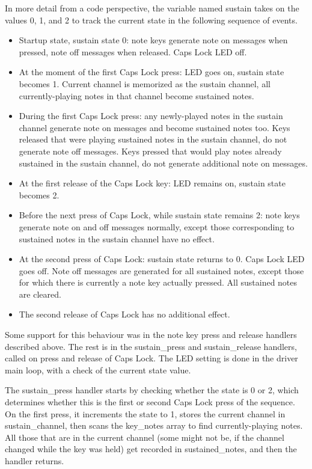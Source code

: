 In more detail from a code perspective, the variable named sustain takes on
the values 0, 1, and 2 to track the current state in the following sequence
of events.
\begin{itemize}
  \item Startup state, sustain state 0:  note keys generate note on messages
    when pressed, note off messages when released.  Caps Lock LED off.
  \item At the moment of the first Caps Lock press:  LED goes on, sustain
    state becomes 1.  Current channel is memorized as the sustain channel,
    all currently-playing notes in that channel become sustained notes.
  \item During the first Caps Lock press:  any newly-played notes in the
    sustain channel generate note on messages and become sustained notes too.
    Keys released that were
    playing sustained notes in the sustain channel, do not generate note
    off messages.  Keys pressed that would play notes already sustained
    in the sustain channel, do not generate additional note on messages.
  \item At the first release of the Caps Lock key:  LED remains on, sustain
    state becomes 2.
  \item Before the next press of Caps Lock, while sustain state remains 2:
    note keys generate note on and off messages normally, except those
    corresponding to sustained notes in the sustain channel have no effect.
  \item At the second press of Caps Lock:  sustain state returns to 0.  Caps
    Lock LED goes off.  Note
    off messages are generated for all sustained notes, except those for
    which there is currently a note key actually pressed.  All sustained
    notes are cleared.
  \item The second release of Caps Lock has no additional effect.
\end{itemize}

Some support for this behaviour was in the note key press and release
handlers described above.  The rest is in the sustain\_press and
sustain\_release handlers, called on press and release of Caps Lock.  The
LED setting is done in the driver main loop, with a check of the current
state value.

The sustain\_press handler starts by checking whether the state is 0 or 2,
which determines whether this is the first or second Caps Lock press of the
sequence.  On the first press, it increments the state to 1, stores the
current channel in sustain\_channel, then scans the key\_notes array to find
currently-playing notes.  All those that are in the current channel (some
might not be, if the channel changed while the key was held) get recorded in
sustained\_notes, and then the handler returns.

